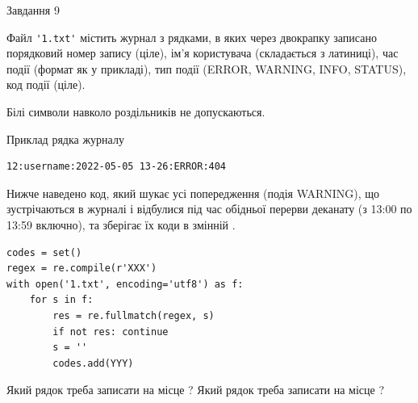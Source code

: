 \documentclass[12pt, ukrainian]{article}
\def\code#1{\Verb!#1!}
\begin{document}
{\begin{minipage}[t]{8.0cm}
\end{minipage}

               
{\begin{center}Завдання {9}\end{center}}
\vspace{-6mm}
Файл \code{'1.txt'} містить журнал з рядками, в яких через двокрапку записано поряд\-ко\-вий номер запису (ціле), ім'я користувача (складається з латиниці), час події (фор\-мат як у прикладі), тип події (ERROR, WARNING, INFO, STATUS), код події (ціле).

Білі символи навколо роздільників не допускаються.

Приклад рядка журналу



\begin{verbatim}
12:username:2022-05-05 13-26:ERROR:404
\end{verbatim}


Нижче наведено код, який шукає усі попередження (подія WARNING), що зустрі\-ча\-ються в журналі і відбулися під час обідньої перерви деканату (з 13:00 по 13:59 включно), та зберігає їх коди в змінній .



\begin{verbatim}
codes = set()
regex = re.compile(r'XXX')
with open('1.txt', encoding='utf8') as f:
    for s in f:
        res = re.fullmatch(regex, s)
        if not res: continue
        s = ''
        codes.add(YYY)
\end{verbatim}





Який рядок треба записати на місце  ?
Який рядок треба записати на місце  ?\par

}
\newpage
\end{document}
